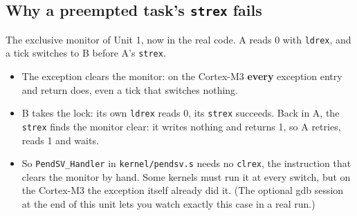 \subsection{Why a preempted task's \texttt{strex} fails}
The exclusive monitor of Unit 1, now in the real code. A reads 0 with \texttt{ldrex}, and a tick switches to B before A's \texttt{strex}.
\begin{itemize}
    \item The exception clears the monitor: on the Cortex-M3 \textbf{every} exception entry and return does, even a tick that switches nothing.
    \item B takes the lock: its own \texttt{ldrex} reads 0, its \texttt{strex} succeeds. Back in A, the \texttt{strex} finds the monitor clear: it writes nothing and returns 1, so A retries, reads 1 and waits.
    \item So \texttt{PendSV\_Handler} in \texttt{kernel/pendsv.s} needs no \texttt{clrex}, the instruction that clears the monitor by hand. Some kernels must run it at every switch, but on the Cortex-M3 the exception itself already did it. (The optional gdb session at the end of this unit lets you watch exactly this case in a real run.)
\end{itemize}

